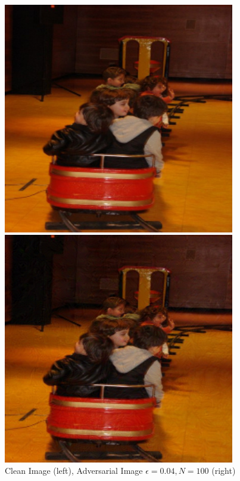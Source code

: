 \begin{figure}
    \centering
    \begin{minipage}{0.45\textwidth}
        \centering
        \includegraphics[width=0.9\textwidth]{figures/distraction_adv_sample_0.png} %
    \end{minipage}\hfill
    \begin{minipage}{0.45\textwidth}
        \centering
        \includegraphics[width=0.9\textwidth]{figures/distraction_adv_sample_0.04.png} %
    \end{minipage}
    \caption{Clean Image (left), Adversarial Image $\epsilon=0.04, N=100$ (right)}
    \label{adv_example_img}
\end{figure}

